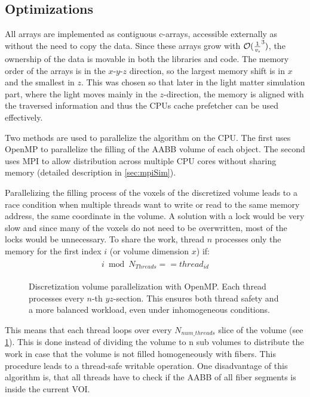 \subsection{Optimizations}\label{sec:dvOpti}
%
All arrays are implemented as contiguous c-arrays, accessible externally as  without the need to copy the data.
Since these arrays grow with $\mathcal{O}(\frac{1}{\textnormal{$\mathit{v_{s}}$}}^3)$, the ownership of the data is movable in both the \cpp{} libraries and \python{} code.
The memory order of the arrays is in the $x\text{-}y\text{-}z$ direction, so the largest memory shift is in $x$ and the smallest in $z$.
This was chosen so that later in the light matter simulation part, where the light moves mainly in the $z$-direction, the memory is aligned with the traversed information and thus the \acp{CPU} cache prefetcher can be used effectively.
\par
%
Two methods are used to parallelize the algorithm on the \ac{CPU}.
The first uses \ac{OpenMP} to parallelize the filling of the \ac{AABB} volume of each object.
The second uses \ac{MPI} to allow distribution across multiple \ac{CPU} cores without sharing memory (detailed description in \cref{sec:mpiSim}).
\par
%
Parallelizing the filling process of the voxels of the discretized volume leads to a race condition when multiple threads want to write or read to the same memory address, \ie{} the same coordinate in the volume.
A solution with a lock would be very slow and since many of the voxels do not need to be overwritten, most of the locks would be unnecessary.
To share the work, thread $n$ processes only the memory for the first index $i$ (or volume dimension $x$) if:
%
\begin{align}
\begin{split}
    i \bmod N_{\mathit{Threads}} == \mathit{thread}_{\mathit{id}}
\end{split}
\end{align}
%
\begin{figure}[!t]
\centering
\setlength{\tikzwidth}{0.5\textwidth}
\caption{Discretization volume parallelization with \ac{OpenMP}. Each thread processes every $n$-th $yz$-section. This ensures both thread safety and a more balanced workload, even under inhomogeneous conditions.}
\label{fig:discVolThread}
\end{figure}
% 
This means that each thread loops over every $N_{\mathit{num\_threads}}$ slice of the volume (see \cref{fig:discVolThread}).
This is done instead of dividing the volume to n sub volumes to distribute the work in case that the volume is not filled homogeneously with fibers.
This procedure leads to a thread-safe writable operation.
One disadvantage of this algorithm is, that all threads have to check if the \ac{AABB} of all fiber segments is inside the current \ac{VOI}.
% 
% 
%
